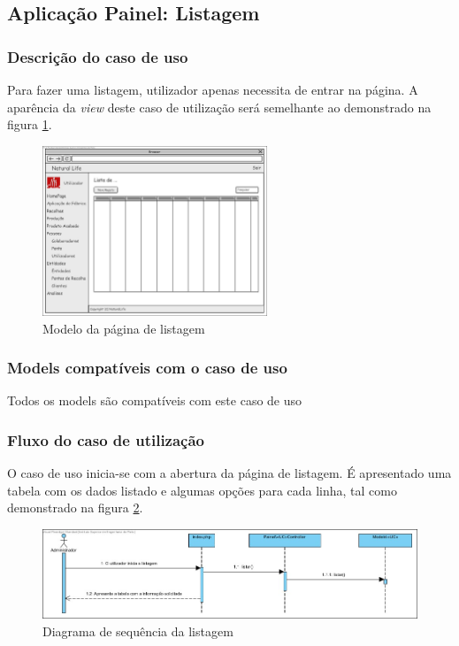 \subsection{Aplicação Painel: Listagem}
\subsubsection*{Descrição do caso de uso}
Para fazer uma listagem, utilizador apenas necessita de entrar na página. A aparência da \textit{view} deste caso de utilização será semelhante ao demonstrado na figura \ref{fig:di_lista}. 

\begin{figure}[H] 
	\begin{center}
		\includegraphics[width=0.60\textwidth,keepaspectratio]{figuras/Diagramas_vp/DI_Painel_1_Lista.jpg}
		\caption{Modelo da página de listagem}
		\label{fig:di_lista} 
	\end{center}
\end{figure}

\subsubsection*{Models compatíveis com o caso de uso}
Todos os models são compatíveis com este caso de uso

\subsubsection*{Fluxo do caso de utilização}
O caso de uso inicia-se com a abertura da página de listagem. É apresentado uma tabela com os dados listado e algumas opções para cada linha, tal como demonstrado na figura \ref{fig:sd_lista}.


\begin{figure}[H] 
	\begin{center}
		\includegraphics[width=\textwidth,keepaspectratio]{figuras/Diagramas_vp/SD_Painel_1_Listar.jpg}
		\caption{Diagrama de sequência da listagem}
		\label{fig:sd_lista} 
	\end{center}
\end{figure}